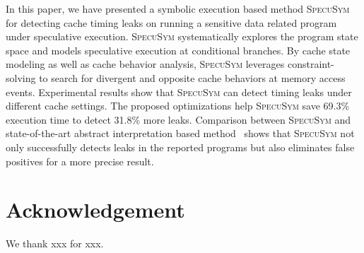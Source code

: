 \documentclass[sigconf]{acmart}
\newcommand{\SpecuSym}{\textsc{SpecuSym} }
\begin{document}
In this paper, we have presented a symbolic execution based method 
\SpecuSym for detecting cache timing leaks on running a sensitive data 
related program under speculative execution. \SpecuSym systematically 
explores the program state space and models speculative execution at 
conditional branches. By cache state modeling as well as cache behavior 
analysis, \SpecuSym leverages constraint-solving to search for divergent 
and opposite cache behaviors at memory access events. Experimental results
show that \SpecuSym can detect timing leaks under different cache settings.
The proposed optimizations help \SpecuSym save 69.3\% execution time to 
detect 31.8\% more leaks. Comparison between \SpecuSym and state-of-the-art 
abstract interpretation based method~\cite{WuW19} shows that \SpecuSym not 
only successfully detects leaks in the reported programs but also eliminates 
false positives for a more precise result.


\section*{Acknowledgement}
We thank xxx for xxx.
\end{document}
